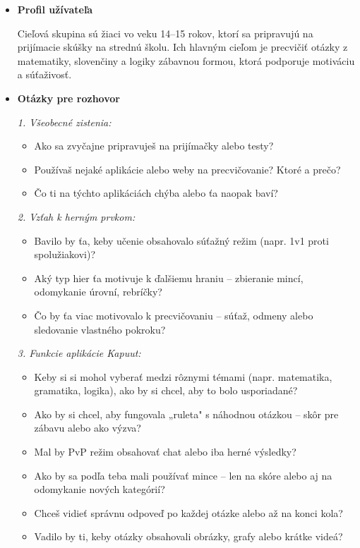 \documentclass[a4paper,12pt]{article}
\begin{document}
\begin{itemize}
	\item \textbf{Profil užívateľa}  

	      Cieľová skupina sú žiaci vo veku 14–15 rokov, ktorí sa pripravujú na prijímacie skúšky na strednú školu. Ich hlavným cieľom je precvičiť otázky z matematiky, slovenčiny a logiky zábavnou formou, ktorá podporuje motiváciu a súťaživosť.  

	\item \textbf{Otázky pre rozhovor}  

	      \textit{1. Všeobecné zistenia:}  
	      \begin{itemize}
	      	\item Ako sa zvyčajne pripravuješ na prijímačky alebo testy?
	      	\item Používaš nejaké aplikácie alebo weby na precvičovanie? Ktoré a prečo?
	      	\item Čo ti na týchto aplikáciách chýba alebo ťa naopak baví?
	      \end{itemize}

	      \textit{2. Vzťah k herným prvkom:}  
	      \begin{itemize}
	      	\item Bavilo by ťa, keby učenie obsahovalo súťažný režim (napr. 1v1 proti spolužiakovi)?
	      	\item Aký typ hier ťa motivuje k ďalšiemu hraniu – zbieranie mincí, odomykanie úrovní, rebríčky?
	      	\item Čo by ťa viac motivovalo k precvičovaniu – súťaž, odmeny alebo sledovanie vlastného pokroku?
	      \end{itemize}

	      \textit{3. Funkcie aplikácie Kapuut:}  
	      \begin{itemize}
	      	\item Keby si si mohol vyberať medzi rôznymi témami (napr. matematika, gramatika, logika), ako by si chcel, aby to bolo usporiadané?
	      	\item Ako by si chcel, aby fungovala „ruleta" s náhodnou otázkou – skôr pre zábavu alebo ako výzva?
	      	\item Mal by PvP režim obsahovať chat alebo iba herné výsledky?
	      	\item Ako by sa podľa teba mali používať mince – len na skóre alebo aj na odomykanie nových kategórií?
	      	\item Chceš vidieť správnu odpoveď po každej otázke alebo až na konci kola?
	      	\item Vadilo by ti, keby otázky obsahovali obrázky, grafy alebo krátke videá?
	      \end{itemize}


\end{itemize}
\end{document}
